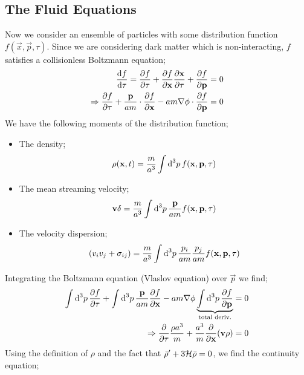 \subsection{The Fluid Equations}
Now we consider an ensemble of particles with some distribution function $f(\vec{x}, \vec{p}, \tau)$. Since we are considering dark matter which is non-interacting, $f$ satisfies a collisionless Boltzmann equation;
\begin{align*}
\frac{\text{d} f}{\text{d} \tau} = \frac{\partial f}{\partial \tau} + \frac{\partial f}{\partial \mathbf{x}}\frac{\partial \mathbf{x}}{\partial \tau} + \frac{\partial f}{\partial \mathbf{p}} &= 0 \\
\Rightarrow \frac{\partial f}{\partial \tau} + \frac{\mathbf{p}}{am}\cdot\frac{\partial f}{\partial \mathbf{x}} - am\nabla \phi \cdot \frac{\partial f}{\partial \mathbf{p}} &= 0
\end{align*}
We have the following moments of the distribution function;
\begin{itemize}
\item The density;
\begin{equation*}
\rho(\mathbf{x}, t) = \frac{m}{a^3}\int{\text{d}^3 p \,f(\mathbf{x}, \mathbf{p}, \tau)}
\end{equation*}
\item The mean streaming velocity;
\begin{equation*}
\mathbf{v} \delta = \frac{m}{a^3}\int{\text{d}^3 p \,\frac{\mathbf{p}}{am}f(\mathbf{x}, \mathbf{p}, \tau)}
\end{equation*}
\item The velocity dispersion;
\begin{equation*}
(v_i v_j + \sigma_{ij}) = \frac{m}{a^3}\int{\text{d}^3 p \,\frac{p_i}{am}\frac{p_j}{am}f(\mathbf{x}, \mathbf{p}, \tau)}
\end{equation*}
\end{itemize}
Integrating the Boltzmann equation (Vlaslov equation) over $\vec{p}$ we find;
\begin{align*}
\int{\text{d}^3 p \, \frac{\partial f}{\partial\tau}} + \int{\text{d}^3 p \,\frac{\mathbf{p}}{am}\frac{\partial f}{\partial\mathbf{x}}} - am \nabla \phi \underbrace{\int{\text{d}^3 p \,\frac{\partial f}{\partial\mathbf{p}}}}_{\text{total deriv.}} &= 0 \\
\Rightarrow \frac{\partial}{\partial \tau}\frac{\rho a^3}{m} + \frac{a^3}{m}\frac{\partial}{\partial \mathbf{x}}(\mathbf{v}\rho) &= 0
\end{align*} 
Using the definition of $\rho$ and the fact that $\bar{\rho}^{\prime} + 3\mathcal{H} \bar{\rho} = 0$, we find the continuity equation;
